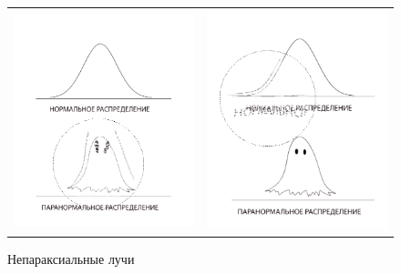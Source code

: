 \documentclass[a4paper,12pt]{article} %
\begin{document}
\begin{figure}[ht]\center
\begin{tabular}{cc}
\includegraphics[width=80mm]{пара_нон1.png}
&
\includegraphics[width=80mm]{пара_нон2.png}
\end{tabular}
\caption{Непараксиальные лучи}
\end{figure}
\end{document}
